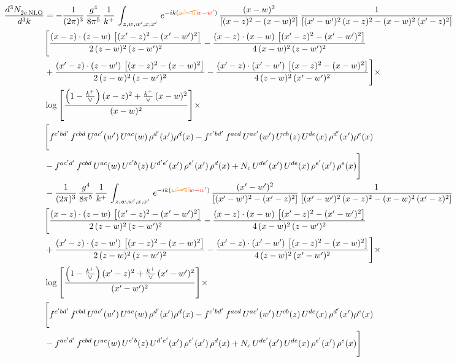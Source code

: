 \documentclass[9pt]{article}
\numberwithin{equation}{section}
\begin{document}
\begin{align}
 \frac{d^{3}N_{2e\,\rm NLO}^{\rm}}{d^{3}k}  & =   -\frac{1}{(2\pi)^{3}}\, \frac{g^{4}}{8\pi^{5}}\,\frac{1}{k^{+}}\,\int_{z,w,w^{\prime},x,x'}\, e^{-ik({\color{orange}\cancel{w^{\prime}-w}}{\color{red}w-w^{\prime}})}\,\frac{(x-w)^{2}}{\left[(x-z)^{2}-(x-w)^{2}\right]}\, \frac{1}{\left[(x'-w')^{2}\, (x-z)^{2} - (x-w)^{2}\, (x'-z)^{2}\right]} \notag \\ & \Bigg[\frac{(x-z)\cdot (z-w)\, \left[(x'-z)^{2}-(x'-w')^{2}\right]}{2\, (z-w)^{2}\, (z-w')^{2}}  - \frac{(x-z)\cdot (x-w)\,\left[(x'-z)^{2}-(x'-w')^{2}\right] }{4\,(x-w)^{2}\,(z-w')^{2}}\notag \\ & +\frac{(x'-z)\cdot (z-w')\, \left[(x-z)^{2}-(x-w)^{2}\right]}{2\, (z-w)^{2}\, (z-w')^{2}}-\frac{(x'-z)\cdot (x'-w')\, \left[(x-z)^{2}-(x-w)^{2}\right]}{4\, (z-w)^{2}\,(x'-w')^{2}}\Bigg]\times\,\notag \\ & \log{\left[\frac{\left(1-\frac{k^{+}}{\vee}\right)(x-z)^{2}+\frac{k^{+}}{\vee}\,(x-w)^{2}}{(x-w)^{2}}\right]}\times\,\notag \\ & \Bigg[f^{c'bd'}\,f^{cbd}\, U^{ac'}(w')\,U^{ac}(w)\,\rho^{d'}(x')\rho^{d}(x)- f^{c'bd'}\,f^{acd}\,U^{ac'}(w')\,U^{cb}(z)\,U^{de}(x)\,\rho^{d'}(x')\rho^{e}(x) \notag \\ & -f^{ac'd'}\,f^{cbd}\,U^{ac}(w)\,U^{c'b}(z)\,U^{d'e'}(x')\,\rho^{e'}(x')\,\rho^{d}(x) +N_{c}\,U^{de'}(x')\,U^{de}(x)\,\rho^{e'}(x')\,\rho^{e}(x)\Bigg] \notag \\
& -\frac{1}{(2\pi)^{3}}\, \frac{g^{4}}{8\pi^{5}}\,\frac{1}{k^{+}}\,\int_{z,w,w^{\prime},x,x'}\, e^{-ik({\color{orange}\cancel{w^{\prime}-w}}{\color{red}w-w^{\prime}})}\, \frac{(x'-w')^{2}}{\left[(x'-w')^{2}-(x'-z)^{2}\right]}\, \frac{1}{\left[(x'-w')^{2}\, (x-z)^{2} - (x-w)^{2}\, (x'-z)^{2}\right]}  \notag \\ & \Bigg[\frac{(x-z)\cdot (z-w)\, \left[(x'-z)^{2}-(x'-w')^{2}\right]}{2\, (z-w)^{2}\, (z-w')^{2}}  - \frac{(x-z)\cdot (x-w)\,\left[(x'-z)^{2}-(x'-w')^{2}\right] }{4\,(x-w)^{2}\,(z-w')^{2}}\notag \\ & +\frac{(x'-z)\cdot (z-w')\, \left[(x-z)^{2}-(x-w)^{2}\right]}{2\, (z-w)^{2}\, (z-w')^{2}}-\frac{(x'-z)\cdot (x'-w')\, \left[(x-z)^{2}-(x-w)^{2}\right]}{4\, (z-w)^{2}\,(x'-w')^{2}}\Bigg]\times\,\notag \\ & \log{\left[\frac{\left(1-\frac{k^{+}}{\vee}\right)(x'-z)^{2}+\frac{k^{+}}{\vee}\,(x'-w')^{2}}{(x'-w')^{2}}\right]}\times\notag \\ & \Bigg[f^{c'bd'}\,f^{cbd}\, U^{ac'}(w')\,U^{ac}(w)\,\rho^{d'}(x')\rho^{d}(x)- f^{c'bd'}\,f^{acd}\,U^{ac'}(w')\,U^{cb}(z)\,U^{de}(x)\,\rho^{d'}(x')\rho^{e}(x) \notag \\ & -f^{ac'd'}\,f^{cbd}\,U^{ac}(w)\,U^{c'b}(z)\,U^{d'e'}(x')\,\rho^{e'}(x')\,\rho^{d}(x) +N_{c}\,U^{de'}(x')\,U^{de}(x)\,\rho^{e'}(x')\,\rho^{e}(x)\Bigg]
\end{align}
\end{document}
